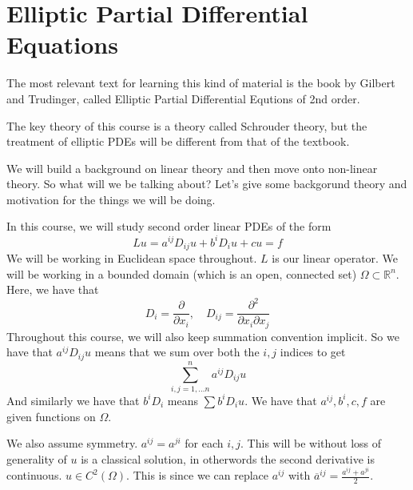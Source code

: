 
\pagebreak 
 
\section{Elliptic Partial Differential Equations}
The most relevant text for learning this kind of 
material is the book by Gilbert and Trudinger, called 
Elliptic Partial Differential Equtions of 2nd order. 

The key theory of this course is a theory 
called Schrouder theory, but the treatment of 
elliptic PDEs will be different from that of the textbook. 

We will build a background on linear theory and then 
move onto non-linear theory. 
So what will we be talking about? Let's give 
some backgorund theory and motivation for the things we will 
be doing. 

In this course, we will study second order linear PDEs of the 
form 
\[
 Lu  = a ^{ ij } D _{ ij } u + b ^ i D _ i u + c u = f 
\] We will be working in Euclidean space throughout. 
$ L $ is our linear operator. 
We will be working in a bounded domain (which is an open, connected set)
$ \Omega \subset \mathbb{ R } ^ n $. 
Here, we have that 
\[
	D _ i = \frac{\partial  }{\partial  x _ i }  , \quad D_{ ij }  = 
	\frac{\partial  ^ 2 }{\partial  x _ i \partial  x _ j } 
\] Throughout this course, 
we will also keep summation convention implicit. 
So we have that $ a ^{ ij }  D_{ ij } u $ means that 
we sum over both the $ i , j $ indices to get 
\[
 \sum _{ i , j = 1 , \dots n } ^{ n } a ^{ ij } D _{ ij } u 
\]  And similarly we have that $ b ^ i D _ i $ 
means $ \sum b^ i D _ i u  $. 
We have that $ a ^{ ij } , b ^ i , c , f $ are given functions on 
$ \Omega $. 

We also assume symmetry. $ a ^{ ij } = a ^{ ji } $ for each $ i , j $. 
This will be without loss of generality of $ u $ is a classical solution, 
in otherwords the second derivative is continuous. $ u \in  C^ 2 \left(  \Omega  \right)  $. 
This is since we can replace $ a ^{ ij } $ with $ \overline{ a } ^{ ij }  = 
\frac{ a ^{ ij }  + a ^{ ji } }{ 2 } $. 

